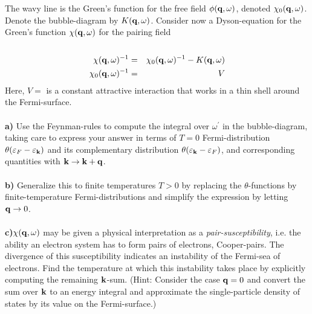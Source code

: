 \documentclass{article}
\newcommand{\comma}{\mathbin{{,}}}
\begin{document}
\begin{center}
\end{center}
\ \\
\ \\
The wavy line is the Green's function for the free field $\phi({\bf q},\omega)$, denoted $\chi_0({\bf q}, \omega)$.
Denote the bubble-diagram by $K({\bf q},\omega)$. Consider now a Dyson-equation for the Green's function 
$\chi({\bf q}, \omega)$ for the pairing field
\ \\
\ \\
\begin{eqnarray}
\chi({\bf q}, \omega)^{-1} & = & \chi_0({\bf q}, \omega)^{-1} - K({\bf q},\omega) \nonumber \\
\chi_0({\bf q}, \omega)^{-1} & = & V \nonumber
\end{eqnarray} 
Here, $V=$ is a constant attractive interaction that works in a thin shell around the Fermi-surface.  
\ \\
\ \\
{\bf a)} Use the Feynman-rules to compute the integral over $\omega^{\prime}$ in the bubble-diagram, taking care to express your answer in terms of $T=0$ Fermi-distribution $\theta(\varepsilon_F-\varepsilon_{\bf k})$ and its complementary  distribution $\theta(\varepsilon_{\bf k} - \varepsilon_F )$, and corresponding quantities with 
${\bf k} \to {\bf k} +{\bf q}$.
\ \\
\ \\
{\bf b)} Generalize this to finite temperatures $T>0$ by replacing the $\theta$-functions by finite-temperature Fermi-distributions and simplify the expression by letting ${\bf q} \to 0$.   
\ \\
\ \\
{\bf c)}$\chi({\bf q}, \omega)$ may be given a physical interpretation as a {\it pair-susceptibility}, i.e. the ability an electron system has to form pairs of electrons, Cooper-pairs. The divergence of this susceptibility indicates an instability of the Fermi-sea of electrons. Find the temperature at which this instability takes place by explicitly computing the remaining ${\bf k}$-sum. (Hint: Consider the case ${\bf q}=0$ and convert the sum over ${\bf k}$ to an energy integral and approximate the single-particle density of states by its value on the Fermi-surface.)
\end{document}
